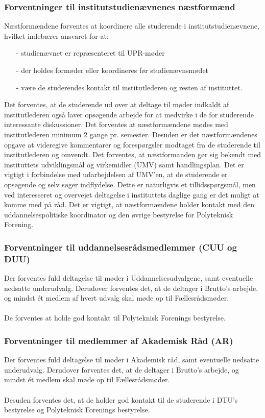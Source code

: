\subsubsection{Forventninger til institutstudienævnenes næstformænd}
Næstformændene forventes at koordinere alle studerende i institutstudienævnene, hvilket indebærer ansvaret for at:
\begin{enumerate}
\item[-] studienævnet er repræsenteret til UPR-møder
\item[-] der holdes formøder eller koordineres før studienævnsmødet
\item[-] være de studerendes kontakt til institutlederen og resten af instituttet.
\end{enumerate}

Det forventes, at de studerende ud over at deltage til møder indkaldt af institutlederen også laver opsøgende arbejde for at medvirke i de for studerende interessante diskussioner. Det forventes at næstformændene mødes med institutlederen minimum 2 gange pr. semester. Desuden er det næstformændenes opgave at videregive kommentarer og forespørgsler modtaget fra de studerende til institutlederen og omvendt. Det forventes, at næstformanden gør sig bekendt med instituttets udviklingsmål og virkemidler (UMV) samt handlingsplan. Det er vigtigt i forbindelse med udarbejdelsen af UMV’en, at de studerende er opsøgende og selv søger indflydelse. Dette er naturligvis et tillidsspørgsmål, men ved interesseret og overvejet deltagelse i instituttets daglige gang er det muligt at komme med på råd.
Det er vigtigt, at næstformændene holder kontakt med den uddannelsespolitiske koordinator og den øvrige bestyrelse for Polyteknisk Forening.

\subsubsection{Forventninger til uddannelsesrådsmedlemmer (CUU og DUU)}
Der forventes fuld deltagelse til møder i Uddannelsesudvalgene, samt eventuelle nedsatte underudvalg. Derudover forventes det, at de deltager i Brutto’s arbejde, og mindst ét medlem af hvert udvalg skal møde op til Fællesrådsmøder. \\
\\
De forventes at holde god kontakt til Polyteknisk Forenings bestyrelse.

\subsubsection{Forventninger til medlemmer af Akademisk Råd (AR)}
Der forventes fuld deltagelse til møder i Akademisk råd, samt eventuelle nedsatte underudvalg. Derudover forventes det, at de deltager i Brutto’s arbejde, og mindst ét medlem skal møde op til Fællesrådsmøder.\\
\\
Desuden forventes det, at de holder god kontakt til de studerende i DTU’s bestyrelse og Polyteknisk Forenings
bestyrelse.


